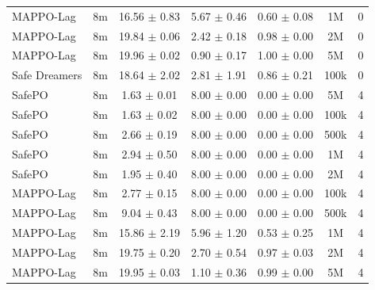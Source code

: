 \begin{longtable}{lcccccc}
MAPPO-Lag & 8m & \textcolor{green!60!black}{16.56 $\pm$ 0.83} & \textcolor{green!60!black}{5.67 $\pm$ 0.46} & \textcolor{green!60!black}{0.60 $\pm$ 0.08} & 1M & 0 \\
MAPPO-Lag & 8m & \textcolor{red!70!black}{19.84 $\pm$ 0.06} & \textcolor{red!70!black}{2.42 $\pm$ 0.18} & \textcolor{red!70!black}{0.98 $\pm$ 0.00} & 2M & 0 \\
MAPPO-Lag & 8m & \textcolor{red!70!black}{19.96 $\pm$ 0.02} & \textcolor{red!70!black}{0.90 $\pm$ 0.17} & \textcolor{red!70!black}{1.00 $\pm$ 0.00} & 5M & 0 \\
Safe Dreamers & 8m & 18.64 $\pm$ 2.02 & 2.81 $\pm$ 1.91 & 0.86 $\pm$ 0.21 & 100k & 0 \\
\midrule
SafePO & 8m & \textcolor{green!60!black}{1.63 $\pm$ 0.01} & \textcolor{green!60!black}{8.00 $\pm$ 0.00} & \textcolor{green!60!black}{0.00 $\pm$ 0.00} & 5M & 4 \\
SafePO & 8m & \textcolor{green!60!black}{1.63 $\pm$ 0.02} & \textcolor{green!60!black}{8.00 $\pm$ 0.00} & \textcolor{green!60!black}{0.00 $\pm$ 0.00} & 100k & 4 \\
SafePO & 8m & \textcolor{green!60!black}{2.66 $\pm$ 0.19} & \textcolor{green!60!black}{8.00 $\pm$ 0.00} & \textcolor{green!60!black}{0.00 $\pm$ 0.00} & 500k & 4 \\
SafePO & 8m & \textcolor{green!60!black}{2.94 $\pm$ 0.50} & \textcolor{green!60!black}{8.00 $\pm$ 0.00} & \textcolor{green!60!black}{0.00 $\pm$ 0.00} & 1M & 4 \\
SafePO & 8m & \textcolor{green!60!black}{1.95 $\pm$ 0.40} & \textcolor{green!60!black}{8.00 $\pm$ 0.00} & \textcolor{green!60!black}{0.00 $\pm$ 0.00} & 2M & 4 \\
MAPPO-Lag & 8m & \textcolor{green!60!black}{2.77 $\pm$ 0.15} & \textcolor{green!60!black}{8.00 $\pm$ 0.00} & \textcolor{green!60!black}{0.00 $\pm$ 0.00} & 100k & 4 \\
MAPPO-Lag & 8m & \textcolor{green!60!black}{9.04 $\pm$ 0.43} & \textcolor{green!60!black}{8.00 $\pm$ 0.00} & \textcolor{green!60!black}{0.00 $\pm$ 0.00} & 500k & 4 \\
MAPPO-Lag & 8m & \textcolor{green!60!black}{15.86 $\pm$ 2.19} & \textcolor{green!60!black}{5.96 $\pm$ 1.20} & \textcolor{green!60!black}{0.53 $\pm$ 0.25} & 1M & 4 \\
MAPPO-Lag & 8m & \textcolor{red!70!black}{19.75 $\pm$ 0.20} & \textcolor{red!70!black}{2.70 $\pm$ 0.54} & \textcolor{red!70!black}{0.97 $\pm$ 0.03} & 2M & 4 \\
MAPPO-Lag & 8m & \textcolor{red!70!black}{19.95 $\pm$ 0.03} & \textcolor{red!70!black}{1.10 $\pm$ 0.36} & \textcolor{red!70!black}{0.99 $\pm$ 0.00} & 5M & 4 \\

\end{longtable}

